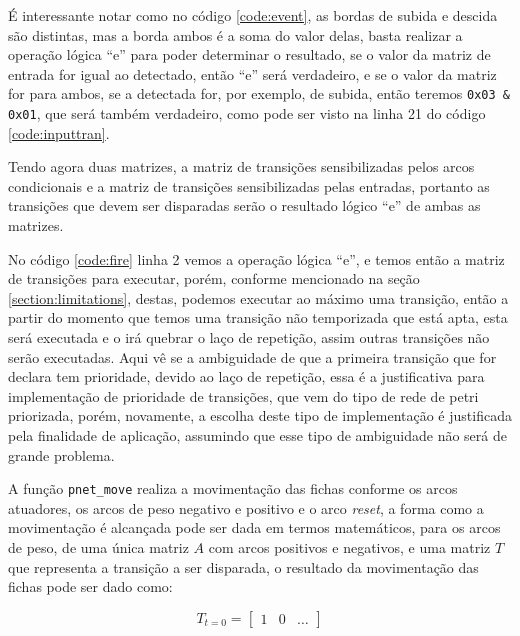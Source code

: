 

É interessante notar como no código \ref{code:event}, as bordas de subida e descida são distintas, mas a borda ambos é a soma do valor delas, basta realizar a operação lógica ``e'' para poder determinar o resultado, se o valor da matriz de entrada for igual ao detectado, então ``e'' será verdadeiro, e se o valor da matriz for para ambos, se a detectada for, por exemplo, de subida, então teremos \lstinline{0x03 & 0x01}, que será também verdadeiro, como pode ser visto na linha 21 do código \ref{code:inputtran}.

Tendo agora duas matrizes, a matriz de transições sensibilizadas pelos arcos condicionais e a matriz de transições sensibilizadas pelas entradas, portanto as transições que devem ser disparadas serão o resultado lógico ``e'' de ambas as matrizes.



No código \ref{code:fire} linha 2 vemos a operação lógica ``e'', e temos então a matriz de transições para executar, porém, conforme mencionado na seção \ref{section:limitations}, destas, podemos executar ao máximo uma transição, então a partir do momento que temos uma transição não temporizada que está apta, esta será executada e o irá quebrar o laço de repetição, assim outras transições não serão executadas. Aqui vê se a ambiguidade de que a primeira transição que for declara tem prioridade, devido ao laço de repetição, essa é a justificativa para implementação de prioridade de transições, que vem do tipo de rede de petri priorizada, porém, novamente, a escolha deste tipo de implementação é justificada pela finalidade de aplicação, assumindo que esse tipo de ambiguidade não será de grande problema. 

A função \lstinline{pnet_move} realiza a movimentação das fichas conforme os arcos atuadores, os arcos de peso negativo e positivo e o arco \textit{reset}, a forma como a movimentação é alcançada pode ser dada em termos matemáticos, para os arcos de peso, de uma única matriz $A$ com arcos positivos e negativos, e uma matriz $T$ que representa a transição a ser disparada, o resultado da movimentação das fichas pode ser dado como: 

$$
T_{t=0} = \begin{bmatrix}
	1 & 0 & \dots
\end{bmatrix}
$$

